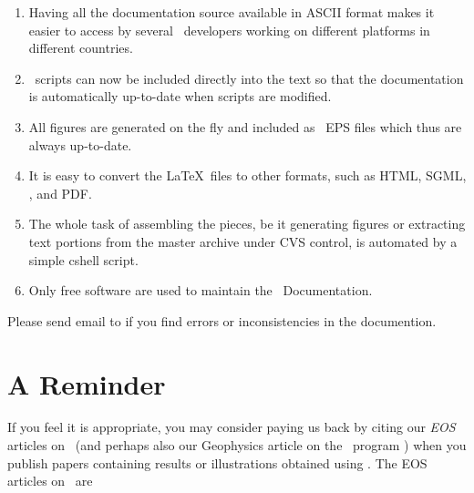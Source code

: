 \begin{enumerate}

\item Having all the documentation source available in
ASCII format makes it easier to access by several
\GMT\ developers working on different platforms in 
different countries.

\item \GMT\ scripts can now be included directly into the text
so that the documentation is automatically up-to-date
when scripts are modified.

\item All figures are generated on the fly and included as
\GMT\ EPS files which thus are always up-to-date.

\item It is easy to convert the \LaTeX\ files to other
formats, such as HTML, SGML, \PS, and PDF.

\item The whole task of assembling the pieces, be it generating
figures or extracting text portions from the master archive under
CVS control, is automated by a simple cshell script.

\item Only free software are used to maintain the \GMT\ Documentation.

\end{enumerate}

Please send email to
if you find errors or inconsistencies in the documention.

\chapter*{A Reminder}

If you feel it is appropriate, you may consider paying us back by
citing our {\it EOS} articles on \GMT\ (and perhaps also our Geophysics
article on the \GMT\ program ) when you publish papers
containing results or illustrations obtained using \GMT.  The EOS
articles on \GMT\ are \\
%
%

